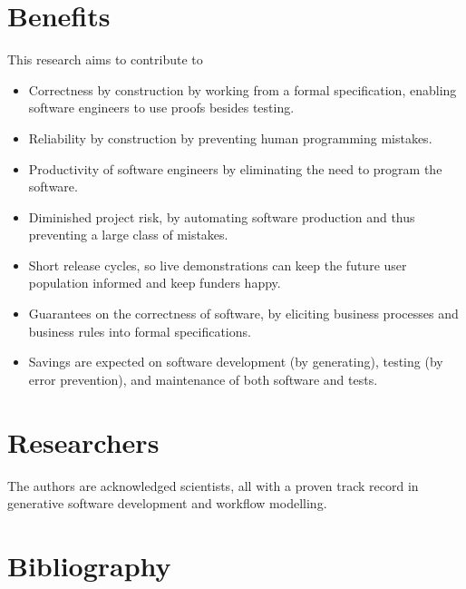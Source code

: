 \documentclass{elsarticle}
\begin{document}
\section{Benefits}
    This research aims to contribute to 
\begin{itemize}
    \item Correctness by construction by working from a formal specification, enabling software engineers to use proofs besides testing.
    \item Reliability by construction by preventing human programming mistakes.
    \item Productivity of software engineers by eliminating the need to program the software.
    \item Diminished project risk, by automating software production and thus preventing a large class of mistakes.
    \item Short release cycles, so live demonstrations can keep the future user population informed and keep funders happy.
    \item Guarantees on the correctness of software, by eliciting business processes and business rules into formal specifications.
    \item Savings are expected on software development (by generating), testing (by error prevention), and maintenance of both software and tests.
\end{itemize}

\section{Researchers}
    The authors are acknowledged scientists, all with a proven track record in generative software development and workflow modelling.

\newpage

\section{Bibliography}
    
    
\end{document}
